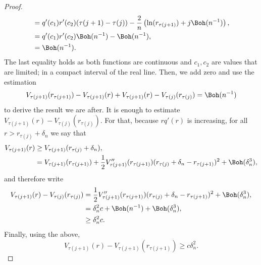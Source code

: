 \begin{proof}
\begin{align}
		& = q'(c_1) r'(c_2) (\tau(j+1) - \tau(j)) - \frac{2}{n} \left(\ln(r_{\tau(j+1)})+j \Boh(n^{-1}) \right), \\
		& = q'(c_1) r'(c_2) \Boh(n^{-1}) - \Boh(n^{-1}), \\
		& = \Boh(n^{-1}).
	\end{align}
	The last equality holds as both functions are continuous and $c_1, c_2$ are values that are limited; in a compact interval of the real line. Then, we add zero and use the estimation
	\begin{equation}
		V_{\tau(j+1)}(r_{\tau(j+1)})  - V_{\tau(j+1)}(r) + V_{\tau(j+1)}(r) - V_{\tau(j)}(r_{\tau(j)}) = \Boh(n^{-1})
	\end{equation}
	to derive the result we are after. It is enough to estimate $V_{\tau(j+1)}(r) - V_{\tau(j)}(r_{\tau(j)})$. For that, because $r q'(r)$ is increasing, for all $r > r_{\tau(j)} + \delta_n$ we say that
	\begin{align}
		V_{\tau(j+1)}(r) & \geq V_{\tau(j+1)}(r_{\tau(j)} + \delta_n), \\
		& =  V_{\tau(j+1)}(r_{\tau(j+1)}) + \frac{1}{2} V''_{\tau(j+1)}(r_{\tau(j+1)}) (r_{\tau(j)} + \delta_n - r_{\tau(j+1)})^2 + \Boh(\delta_n^3),
	\end{align} 
	and therefore write
	\begin{align}
		V_{\tau(j+1)}(r) - V_{\tau(j)}(r_{\tau(j)}) & =  \frac{1}{2} V''_{\tau(j+1)}(r_{\tau(j+1)}) (r_{\tau(j)} + \delta_n - r_{\tau(j+1)})^2 + \Boh(\delta_n^3), \\
		& = \delta_n^2 c + \Boh(n^{-1}) + \Boh(\delta_n^3), \\
		& \geq  \delta_n^2 c.
	\end{align}
	Finally, using the above,
	\begin{equation}
		V_{\tau(j+1)}(r) - V_{\tau(j+1)}(r_{\tau(j+1)}) \geq c \delta_n^2.
	\end{equation}


\end{proof}
